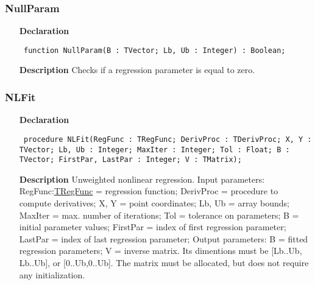 \documentclass[12pt,a4paper,oneside]{report}
\newcommand{\declarationitem}[1]{\textbf{#1}}
\newcommand{\descriptiontitle}[1]{\textbf{#1}}
\newcommand{\code}[1]{\texttt{#1}}
\begin{document}
\subsubsection{NullParam}
\label{unlfit-NullParam}
\begin{itemize}\item[\declarationitem{Declaration}\hfill]
	\begin{flushleft}
		\code{
			function NullParam(B : TVector; Lb, Ub : Integer) : Boolean;}
		
	\end{flushleft}
	
	\par
	\item[\descriptiontitle{Description}]
	Checks if a regression parameter is equal to zero.
	
\end{itemize}
\subsubsection{NLFit}
\label{unlfit-NLFit}
\begin{itemize}\item[\declarationitem{Declaration}\hfill]
	\begin{flushleft}
		\code{
			procedure NLFit(RegFunc : TRegFunc; DerivProc : TDerivProc; X, Y : TVector; Lb, Ub : Integer; MaxIter : Integer; Tol : Float; B : TVector; FirstPar, LastPar : Integer; V : TMatrix);}
		
	\end{flushleft}
	
	\par
	\item[\descriptiontitle{Description}]
	Unweighted nonlinear regression. Input parameters: RegFunc:\hyperref[utypes-TRegFunc]{TRegFunc} = regression function; DerivProc = procedure to compute derivatives; X, Y = point coordinates; Lb, Ub = array bounds; MaxIter = max. number of iterations; Tol = tolerance on parameters; B = initial parameter values; FirstPar = index of first regression parameter; LastPar = index of last regression parameter; Output parameters: B = fitted regression parameters; V = inverse matrix. Its dimentions must be [Lb..Ub, Lb..Ub], or [0..Ub,0..Ub]. The matrix must be allocated, but does not require any initialization.
	
\end{itemize}
\end{document}
